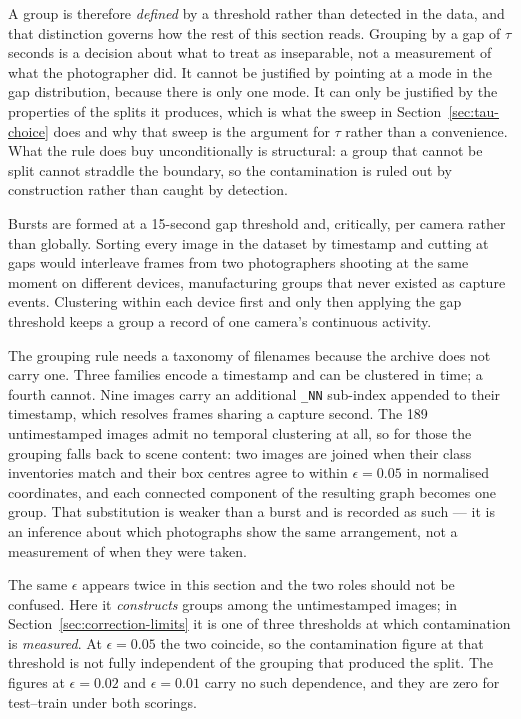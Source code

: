 A group is therefore \emph{defined} by a threshold rather than detected in the
data, and that distinction governs how the rest of this section reads. Grouping
by a gap of $\tau$ seconds is a decision about what to treat as inseparable, not
a measurement of what the photographer did. It cannot be justified by pointing
at a mode in the gap distribution, because there is only one mode. It can only
be justified by the properties of the splits it produces, which is what the
sweep in Section~\ref{sec:tau-choice} does and why that sweep is the argument
for $\tau$ rather than a convenience. What the rule does buy unconditionally is
structural: a group that cannot be split cannot straddle the boundary, so the
contamination is ruled out by construction rather than caught by detection.

Bursts are formed at a 15-second gap threshold and, critically, per camera
rather than globally. Sorting every image in the dataset by timestamp and
cutting at gaps would interleave frames from two photographers shooting at the
same moment on different devices, manufacturing groups that never existed as
capture events. Clustering within each device first and only then applying the
gap threshold keeps a group a record of one camera's continuous activity.

The grouping rule needs a taxonomy of filenames because the archive does not
carry one. Three families encode a timestamp and can be clustered in time; a
fourth cannot. Nine images carry an additional \texttt{\_NN} sub-index
appended to their timestamp, which resolves frames sharing a capture second.
The 189 untimestamped images admit no temporal clustering at all, so for those
the grouping falls back to scene content: two images are joined when their class
inventories match and their box centres agree to within $\epsilon = 0.05$ in
normalised coordinates, and each connected component of the resulting graph
becomes one group. That substitution is weaker than a burst and is recorded as
such --- it is an inference about which photographs show the same arrangement,
not a measurement of when they were taken.

The same $\epsilon$ appears twice in this section and the two roles should not
be confused. Here it \emph{constructs} groups among the untimestamped images;
in Section~\ref{sec:correction-limits} it is one of three thresholds at which
contamination is \emph{measured}. At $\epsilon = 0.05$ the two coincide, so the
contamination figure at that threshold is not fully independent of the grouping
that produced the split. The figures at $\epsilon = 0.02$ and $\epsilon = 0.01$
carry no such dependence, and they are zero for test--train under both scorings.

